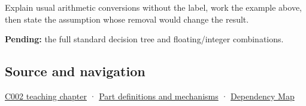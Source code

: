 Explain usual arithmetic conversions without the label, work the example above, then state the assumption whose removal would change the result.

\textbf{Pending:} the full standard decision tree and floating/integer combinations.

\subsection{Source and navigation}\label{appendix-5e2d663adf7f-source-and-navigation}

\hyperref[01-foundations-i-ch001-arithmetic-becomes-a-policy]{C002 teaching chapter} · \hyperref[appendix-fd090d982a15]{Part definitions and mechanisms} · \hyperref[appendix-4ad47bdd269a]{Dependency Map}
